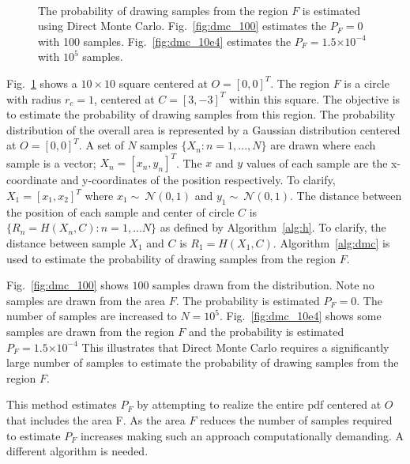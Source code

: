 \documentclass[journal]{IEEEtran}
\providecommand{\e}[1]{\ensuremath{\times 10^{#1}}}
\begin{document}
\begin{figure}[!t]\centering
	\\
	\caption{The probability of drawing samples from the region $F$ is estimated using Direct Monte Carlo. Fig.~\ref{fig:dmc_100} estimates the $P_{F} = 0$ with 100 samples. Fig.~\ref{fig:dmc_10e4} estimates the $P_{F} = 1.5\e{-4}$ with $10^{5}$ samples.}
	\label{fig:DMC_100_10e4}
\end{figure}

Fig.~\ref{fig:DMC_100_10e4} shows a $10 \times 10$ square centered at $O = [0,0]^{T}$. The region $F$ is a circle with radius $r_{c} = 1$, centered at $C = [3,-3]^{T}$ within this square. The objective is to estimate the probability of drawing samples from this region. The probability distribution of the overall area is represented by a Gaussian distribution centered at $O = [0,0]^{T}$. A set of $N$ samples $\{X_{n}: n = 1,...,N\}$ are drawn where each sample is a vector; $X_{n} = [x_{n},y_{n}]^{T}$. The $x$ and $y$ values of each sample are the x-coordinate and y-coordinates of the position respectively. To clarify, $X_{1} = [x_{1},x_{2}]^{T}$ where $x_{1} \sim{~} \mathcal{N}(0,1)$ and $y_{1} \sim{~} \mathcal{N}(0,1)$. The distance between the position of each sample and center of circle $C$ is $\{R_{n} = H(X_{n},C): n = 1,...N\}$ as defined by Algorithm~\ref{alg:h}. To clarify, the distance between sample $X_{1}$ and $C$ is $R_{1} = H(X_{1},C)$. Algorithm~\ref{alg:dmc} is used to estimate the probability of drawing samples from the region $F$.

Fig.~\ref{fig:dmc_100} shows $100$ samples drawn from the distribution. Note no samples are drawn from the area $F$. The probability is estimated $P_{F} = 0$. The number of samples are increased to $N = 10^{5}$. Fig.~\ref{fig:dmc_10e4} shows some samples are drawn from the region $F$ and the probability is estimated $P_{F} = 1.5\e{-4}$ This illustrates that Direct Monte Carlo requires a significantly large number of samples to estimate the probability of drawing samples from the region $F$.



This method estimates $P_{F}$ by attempting to realize the entire pdf centered at $O$ that includes the area F. As the area $F$ reduces the number of samples required to estimate $P_{F}$ increases making such an approach computationally demanding. A different algorithm is needed. 
\end{document}
